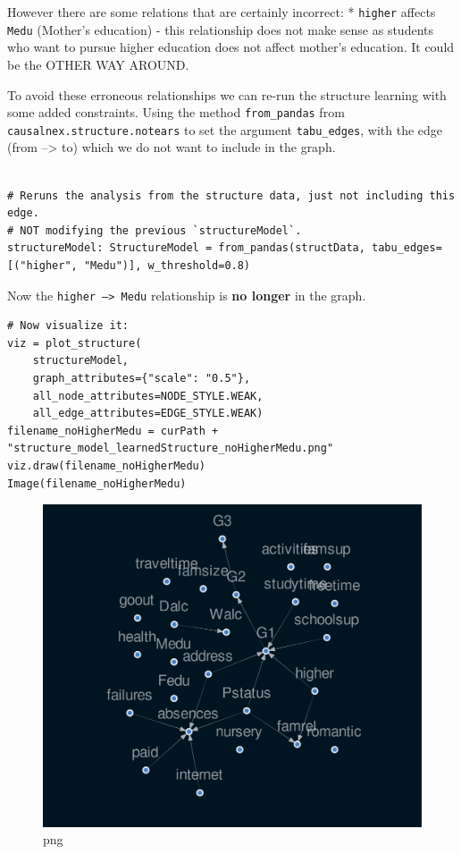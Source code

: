 \documentclass[
]{article}
\begin{document}
However there are some relations that are certainly incorrect: *
\texttt{higher} affects \texttt{Medu}
(Mother's education) - this relationship does not make sense as students
who want to pursue higher education does not affect mother's education.
It could be the OTHER WAY AROUND.

To avoid these erroneous relationships we can re-run the structure
learning with some added constraints. Using the method
\texttt{from_pandas} from
\texttt{causalnex.structure.notears} to set the argument
\texttt{tabu_edges}, with the edge (from --\textgreater{}
to) which we do not want to include in the graph.

\begin{verbatim}

# Reruns the analysis from the structure data, just not including this edge.
# NOT modifying the previous `structureModel`.
structureModel: StructureModel = from_pandas(structData, tabu_edges=[("higher", "Medu")], w_threshold=0.8)
\end{verbatim}

Now the \texttt{higher --> Medu} relationship is
\textbf{no longer} in the graph.

\begin{verbatim}
# Now visualize it:
viz = plot_structure(
    structureModel,
    graph_attributes={"scale": "0.5"},
    all_node_attributes=NODE_STYLE.WEAK,
    all_edge_attributes=EDGE_STYLE.WEAK)
filename_noHigherMedu = curPath + "structure_model_learnedStructure_noHigherMedu.png"
viz.draw(filename_noHigherMedu)
Image(filename_noHigherMedu)
\end{verbatim}

\begin{figure}
\centering
\includegraphics{FirstCausalNexTutorial_files/FirstCausalNexTutorial_87_0.png}
\caption{png}
\end{figure}
\end{document}
